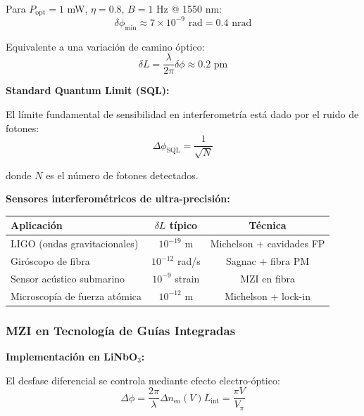 \documentclass[11pt,a4paper]{article}
\begin{document}
Para $P_{\text{opt}} = 1$ mW, $\eta = 0.8$, $B = 1$ Hz @ 1550 nm:
\begin{equation}
    \delta\phi_{\text{min}} \approx 7 \times 10^{-9} \text{ rad} = 0.4 \text{ nrad}
\end{equation}

Equivalente a una variación de camino óptico:
\begin{equation}
    \delta L = \frac{\lambda}{2\pi}\delta\phi \approx 0.2 \text{ pm}
\end{equation}

\textbf{Standard Quantum Limit (SQL):}

El límite fundamental de sensibilidad en interferometría está dado por el ruido de fotones:
\begin{equation}
    \Delta\phi_{\text{SQL}} = \frac{1}{\sqrt{N}}
\end{equation}

donde $N$ es el número de fotones detectados.

\begin{importante}
\textbf{Sensores interferométricos de ultra-precisión:}

\begin{tabular}{lcc}
\hline
\textbf{Aplicación} & \textbf{$\delta L$ típico} & \textbf{Técnica} \\
\hline
LIGO (ondas gravitacionales) & $10^{-19}$ m & Michelson + cavidades FP \\
Giróscopo de fibra & $10^{-12}$ rad/s & Sagnac + fibra PM \\
Sensor acústico submarino & $10^{-9}$ strain & MZI en fibra \\
Microscopía de fuerza atómica & $10^{-12}$ m & Michelson + lock-in \\
\hline
\end{tabular}
\end{importante}

\subsubsection{MZI en Tecnología de Guías Integradas}

\textbf{Implementación en LiNbO$_3$:}

El desfase diferencial se controla mediante efecto electro-óptico:
\begin{equation}
    \Delta\phi = \frac{2\pi}{\lambda}\Delta n_{\text{eo}}(V) L_{\text{int}} = \frac{\pi V}{V_\pi}
\end{equation}
\end{document}
